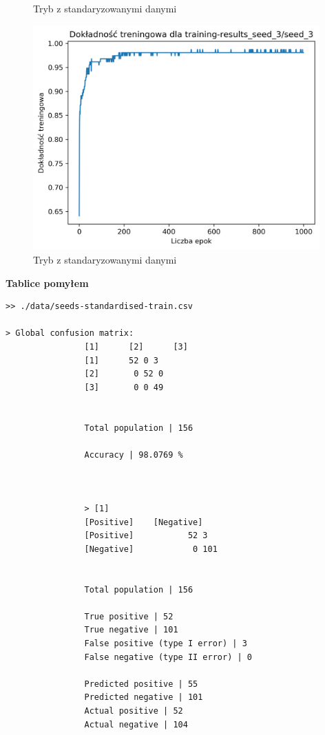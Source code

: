 \documentclass{classrep}
\begin{document}
{{{\begin{figure}[!htbp]
                    \caption{Tryb z standaryzowanymi danymi}
                \end{figure}
                \begin{figure}[!htbp]
                    \centering
                    \includegraphics[width=110mm]{wykresy/seed_3_training-accuracy.png}
                    \caption{Tryb z standaryzowanymi danymi}
                \end{figure}
                \FloatBarrier
                \textbf{Tablice pomyłem}
                \begin{lstlisting}
>> ./data/seeds-standardised-train.csv

> Global confusion matrix:
                [1]      [2]      [3]
                [1]      52 0 3
                [2]       0 52 0
                [3]       0 0 49


                Total population | 156

                Accuracy | 98.0769 %



                > [1]
                [Positive]    [Negative]
                [Positive]           52 3
                [Negative]            0 101


                Total population | 156

                True positive | 52
                True negative | 101
                False positive (type I error) | 3
                False negative (type II error) | 0

                Predicted positive | 55
                Predicted negative | 101
                Actual positive | 52
                Actual negative | 104


\end{lstlisting}}}}
\end{document}
